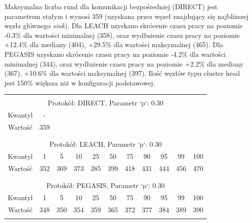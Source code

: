 \documentclass[a4paper,12pt,twoside,openany]{report}
\begin{document}
\par
Maksymalna liczba rund dla komunikacji bezpośredniej (DIRECT) jest parametrem stałym i wynosi 359 (uzyskana przez węzeł znajdujący się najbliższej węzła głównego \textit{sink}).
Dla LEACH uzyskano skrócenie czasu pracy na poziomie -0.3\% dla wartości minimalnej (358), oraz wydłużenie czasu pracy na poziomie +12.4\% dla mediany (404), +29.5\% dla wartości maksymalnej (465).
Dla PEGASIS uzyskano skrócenie czasu pracy na poziomie -4.2\% dla wartości minimalnej (344), oraz wydłużenie czasu pracy na poziomie +2.2\% dla mediany (367), +10.6\% dla wartości maksymalnej (397).
Ilość węzłów typu cluster head jest 150\% większa niż w konfiguracji podstawowej.

\begin{longtable}{*{11}{c}}
\toprule \\*
\multicolumn{11}{c}{Protokół: DIRECT, Parametr `p`: 0.30} \\*
Kwantyl	& -	\\*
Wartość	& 359	\\*
\midrule \\*
\\*
\multicolumn{11}{c}{Protokół: LEACH, Parametr `p`: 0.30} \\*
Kwantyl	& 1	& 5	& 10	& 25	& 50	& 75	& 90	& 95	& 99	& 100	\\*
Wartość	& 352	& 369	& 373	& 385	& 399	& 418	& 431	& 444	& 456	& 470	\\*
\midrule \\*
\\*
\multicolumn{11}{c}{Protokół: PEGASIS, Parametr `p`: 0.30} \\*
Kwantyl	& 1	& 5	& 10	& 25	& 50	& 75	& 90	& 95	& 99	& 100	\\*
Wartość	& 348	& 350	& 354	& 359	& 365	& 372	& 377	& 384	& 389	& 390	\\*	
\bottomrule \\*
\end{longtable}
\end{document}
